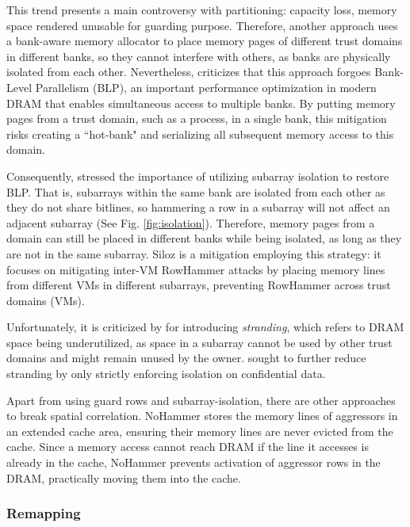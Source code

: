 \documentclass[journal,twocolumn]{IEEEtran}
\begin{document}
This trend presents a main controversy with partitioning:
capacity loss, memory space rendered unusable for
guarding purpose. Therefore, another approach uses a bank-aware memory allocator\cite{Yun14} to place memory pages of different trust domains in different banks, so they cannot interfere with others, as banks are physically isolated from each other. Nevertheless, \cite{Loughlin21} criticizes that this approach forgoes Bank-Level Parallelism (BLP), an important
performance optimization in modern DRAM that enables simultaneous access to multiple banks. By putting memory pages from a trust domain, such as a process, in a single bank, this mitigation risks creating a ``hot-bank" and serializing all subsequent memory access to this domain.

Consequently, \cite{Loughlin21} stressed the importance of utilizing subarray isolation to restore BLP. That is, subarrays within the same bank are isolated from each other as they do not share bitlines, so hammering a row in a subarray will not affect an adjacent subarray (See Fig. \ref{fig:isolation}). Therefore, memory pages from a domain can still be placed in different banks while being isolated, as long as they are not in the same subarray. Siloz\cite{Loughlin23} is a mitigation employing this strategy: it focuses on mitigating inter-VM RowHammer attacks by placing memory lines from different VMs in different subarrays, preventing RowHammer across trust domains (VMs).

Unfortunately, it is criticized by \cite{Saxena24_2} for introducing \textit{stranding}, which refers to DRAM space being underutilized, as space in a subarray cannot be used by other trust domains and might remain unused by the owner. \cite{Saxena24_2,M25} sought to further reduce stranding by only strictly enforcing isolation on confidential data.

Apart from using guard rows and subarray-isolation, there are other approaches to break spatial correlation. NoHammer\cite{Lee23} stores the memory lines of aggressors in an extended cache area, ensuring their memory lines are never evicted from the cache. Since a memory access cannot reach DRAM if the line it accesses is already in the cache, NoHammer prevents activation of aggressor rows in the DRAM, practically moving them into the cache.

\subsubsection{Remapping}
\end{document}

